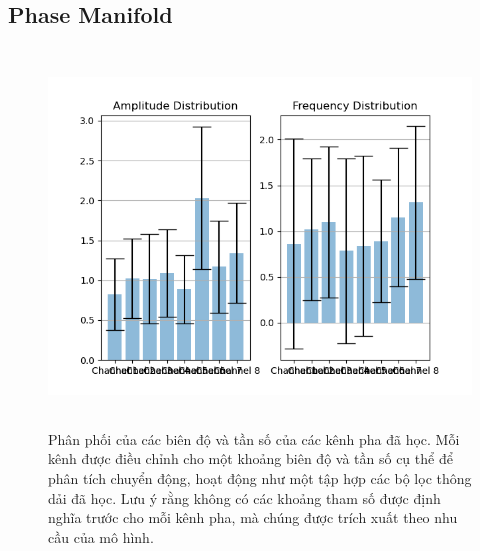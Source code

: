 

\subsection{Phase Manifold}
\label{sec:summary_diffusion}


\begin{figure}
	\centering
	\includegraphics[height=10cm,width=\linewidth]{images/distribution.png}
	\caption{Phân phối của các biên độ và tần số của các kênh pha đã học. Mỗi kênh được điều chỉnh cho một khoảng biên độ và tần số cụ thể để phân tích chuyển động, hoạt động như một tập hợp các bộ lọc thông dải đã học. Lưu ý rằng không có các khoảng tham số được định nghĩa trước cho mỗi kênh pha, mà chúng được trích xuất theo nhu cầu của mô hình.}
	\label{fig:distribution}
\end{figure}

